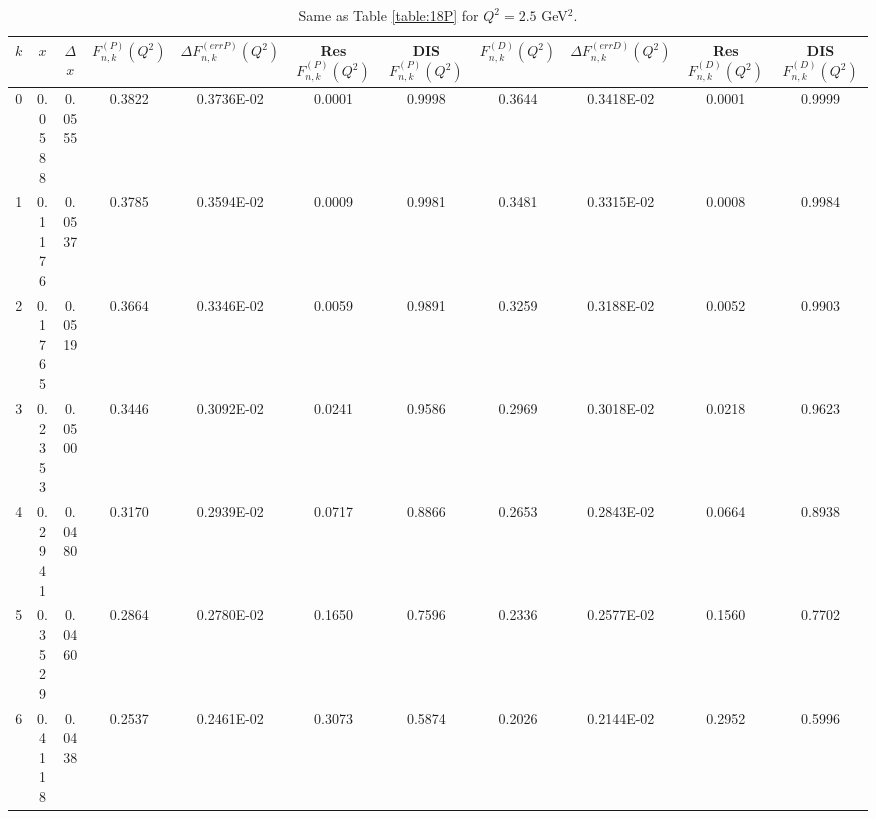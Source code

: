 \documentclass[
twocolumn,
aps,prd,
nofootinbib,
superscriptaddress,
showpacs,ligh
tightenlines, 
]{revtex4}
\begin{document}
\begin{widetext}
\begin{table}[h]
\begin{center}
\caption{Same as Table \ref{table:18P} for $Q^{2} = 2.5$ GeV$^{2}$.}
\begin{tabular}{|c|c|c|c|c|c|c|c|c|c|c|}
\hline
\hline
  $k$  & $x$   & $\Delta$ $x$   &  $F_{n,k}^{(P)}(Q^{2})$  & $\Delta F_{n,k}^{(err P )}(Q^{2})$ &  Res $F_{n,k}^{(P)}(Q^{2})$  & DIS     $F_{n,k}^{(P)}(Q^{2})$  &   $F_{n,k}^{(D)}(Q^{2})$  & $\Delta F_{n,k}^{(err D )}(Q^{2})$ &  Res $F_{n,k}^{(D)}(Q^{2})$  & DIS     $F_{n,k}^{(D)}(Q^{2})$     \\
\hline
\hline
     0                 &        0.0588             &        0.0555             &     0.3822                 &     0.3736E-02             &        0.0001             &        0.9998  &   0.3644                 &     0.3418E-02             &        0.0001             &        0.9999   \\
1                 &        0.1176             &        0.0537             &     0.3785                 &     0.3594E-02             &        0.0009             &        0.9981             & 0.3481 & 0.3315E-02 & 0.0008 & 0.9984 \\
      2                 &        0.1765             &        0.0519             &     0.3664                 &     0.3346E-02             &        0.0059             &        0.9891             & 0.3259 & 0.3188E-02 & 0.0052 & 0.9903 \\
      3                 &        0.2353             &        0.0500             &     0.3446                 &     0.3092E-02             &        0.0241             &        0.9586             & 0.2969 & 0.3018E-02 & 0.0218 & 0.9623 \\
      4                 &        0.2941             &        0.0480             &     0.3170                 &     0.2939E-02             &        0.0717             &        0.8866             & 0.2653 & 0.2843E-02 & 0.0664 & 0.8938 \\
      5                 &        0.3529             &        0.0460             &     0.2864                 &     0.2780E-02             &        0.1650             &        0.7596             & 0.2336 & 0.2577E-02 & 0.1560 & 0.7702 \\
      6                 &        0.4118             &        0.0438             &     0.2537                 &     0.2461E-02             &        0.3073             &        0.5874             & 0.2026 & 0.2144E-02 & 0.2952 & 0.5996 \\

\end{tabular}
\end{center}
\end{table}
\end{widetext}
\end{document}
